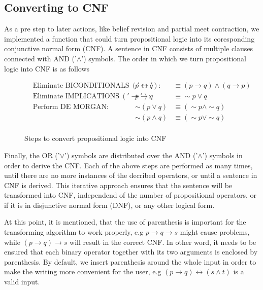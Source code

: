 \documentclass[a4paper,10pt]{article}
\begin{document}
\subsection{Converting to CNF}
\label{subsec:implementation_cnf}
As a pre step to later actions, like belief revision and partial meet contraction, we implemented a function that could turn propositional logic into its coresponding conjunctive normal form (CNF). A sentence in CNF consists of multiple clauses connected with AND ('$\wedge$') symbols. The order in which we turn propositional logic into CNF is as follows

\begin{figure}[h]
	\begin{align*}
		&\text{Eliminate BICONDITIONALS}\ ('\leftrightarrow'): & p\leftrightarrow q &\equiv (p\rightarrow q) \wedge (q\rightarrow p) \\
		&\text{Eliminate IMPLICATIONS}\ ('\rightarrow'): & p\rightarrow q &\equiv \sim p\vee q \\
		&\text{Perform DE MORGAN}: & \sim(p\vee q) &\equiv (\sim p\wedge\sim q) \\
		&						   & \sim(p\wedge q) &\equiv (\sim p\vee\sim q) \\					
	\end{align*}
	\caption{Steps to convert propositional logic into CNF}
	\label{fig:cnf_rules}
\end{figure}
 
Finally, the OR ('$\vee$') symbols are distributed over the AND ('$\wedge$') symbols in order to derive the CNF. Each of the above steps are performed as many times, until there are no more instances of the decribed operators, or until a sentence in CNF is derived. This iterative approach ensures that the sentence will be transformed into CNF, independend of the number of propositional operators, or if it is in disjunctive normal form (DNF), or any other logical form.

At this point, it is mentioned, that the use of parenthesis is important for the transforming algorithm to work properly, e.g $p\rightarrow q\rightarrow s$ might cause problems, while $(p\rightarrow q)\rightarrow s$ will result in the correct CNF. In other word, it needs to be ensured that each binary operator together with its two arguments is enclosed by parenthesis. By default, we insert parenthesis around the whole input in order to make the writing more convenient for the user, e.g $(p\rightarrow q)\leftrightarrow (s\wedge t)$ is a valid input.
\end{document}
